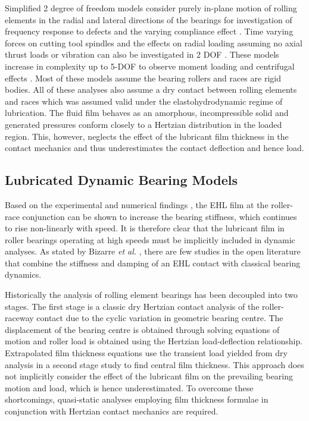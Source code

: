 Simplified 2 degree of freedom models \cite{Walters1971} consider purely in-plane motion of rolling elements in the radial and lateral directions of the bearings for investigation of frequency response to defects \cite{Meyer1980} and the varying compliance effect \cite{Sunnersjo1978}.  Time varying forces on cutting tool spindles and the effects on radial loading assuming no axial thrust loads or vibration can also be investigated in 2 DOF \cite{Matsubara1988}. These models increase in complexity up to 5-DOF  to observe moment loading and centrifugal effects \cite{Gupta1979} \cite{Aini1990} \cite{Rahnejat2004}. Most of these models assume the bearing rollers and races are rigid bodies. All of these analyses also assume a dry contact between rolling elements and races which was assumed valid under the elastohydrodynamic regime of lubrication. The fluid film behaves as an amorphous, incompressible solid and generated pressures conform closely to a Hertzian distribution in the loaded region. This, however, neglects the effect of the lubricant film thickness in the contact mechanics and thus underestimates the contact deflection and hence load.

\subsection{Lubricated Dynamic Bearing Models}

Based on the experimental and numerical findings \cite{Questa2020} \cite{Stone1982} \cite{Dietl1997}, the EHL film at the roller-race conjunction can be shown to increase the bearing stiffness, which continues to rise non-linearly with speed. It is therefore clear that the lubricant film in roller bearings operating at high speeds must be implicitly included in dynamic analyses. As stated by Bizarre \textit{et al.} \cite{Bizarre2018}, there are few studies in the open literature that combine the stiffness and damping of an EHL contact with classical bearing dynamics.

Historically the analysis of rolling element bearings has been decoupled into two stages. The first stage is a classic dry Hertzian contact analysis of the roller-raceway contact due to the cyclic variation in geometric bearing centre.  The displacement of the bearing centre is obtained through solving equations of motion and roller load is obtained using the Hertzian load-deflection relationship. Extrapolated film thickness equations use the transient load yielded from dry analysis in a second stage study to find central film thickness. This approach does not implicitly consider the effect of the lubricant film on the prevailing bearing motion and load, which is hence underestimated. To overcome these shortcomings, quasi-static analyses employing film thickness formulae in conjunction with Hertzian contact mechanics are required.

